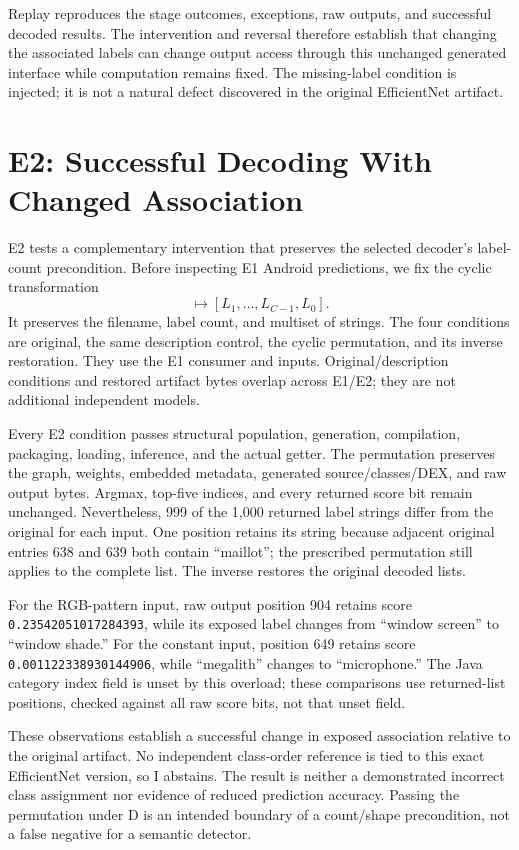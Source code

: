 \documentclass[10pt,twocolumn,letterpaper]{article}
\newcommand{\code}[1]{\texttt{#1}}
\begin{document}
Replay reproduces the stage outcomes, exceptions, raw outputs, and successful decoded results. The intervention and reversal therefore establish that changing the associated labels can change output access through this unchanged generated interface while computation remains fixed. The missing-label condition is injected; it is not a natural defect discovered in the original EfficientNet artifact.

\section{E2: Successful Decoding With Changed Association}
\label{sec:e2}
E2 tests a complementary intervention that preserves the selected decoder's label-count precondition. Before inspecting E1 Android predictions, we fix the cyclic transformation
\begin{equation}
[L_0,L_1,\ldots,L_{C-1}]\mapsto[L_1,\ldots,L_{C-1},L_0].
\end{equation}
It preserves the filename, label count, and multiset of strings. The four conditions are original, the same description control, the cyclic permutation, and its inverse restoration. They use the E1 consumer and inputs. Original/description conditions and restored artifact bytes overlap across E1/E2; they are not additional independent models.

Every E2 condition passes structural population, generation, compilation, packaging, loading, inference, and the actual getter. The permutation preserves the graph, weights, embedded metadata, generated source/classes/DEX, and raw output bytes. Argmax, top-five indices, and every returned score bit remain unchanged. Nevertheless, 999 of the 1,000 returned label strings differ from the original for each input. One position retains its string because adjacent original entries 638 and 639 both contain ``maillot''; the prescribed permutation still applies to the complete list. The inverse restores the original decoded lists.

For the RGB-pattern input, raw output position 904 retains score \code{0.23542051017284393}, while its exposed label changes from ``window screen'' to ``window shade.'' For the constant input, position 649 retains score \code{0.001122338930144906}, while ``megalith'' changes to ``microphone.'' The Java category index field is unset by this overload; these comparisons use returned-list positions, checked against all raw score bits, not that unset field.

These observations establish a successful change in exposed association relative to the original artifact. No independent class-order reference is tied to this exact EfficientNet version, so I abstains. The result is neither a demonstrated incorrect class assignment nor evidence of reduced prediction accuracy. Passing the permutation under D is an intended boundary of a count/shape precondition, not a false negative for a semantic detector.
\end{document}

